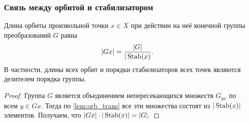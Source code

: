 \subsubsection{Связь между орбитой и стабилизатором}

\begin{proposition}
Длина орбиты произвольной точки $x \in X$ при действии на неё конечной группы преобразований $G$ равна $$|Gx| = \frac{|G|}{|\operatorname{Stab}(x)}.$$ В частности, длины всех орбит и порядки стабилизаторов всех точек являются делителем порядка группы.
\end{proposition}
\begin{proof}
    Группа $G$ является объединением непересекающихся множеств $G_{yx}$ по всем $y \in Gx$. Тогда по \cref{lem:orb_trans} все эти множества состоят из $|\operatorname{Stab}(x)|$ элементов. Получаем, что $|Gx|\cdot|\operatorname{Stab}(x)|=|G|.$
\end{proof}


